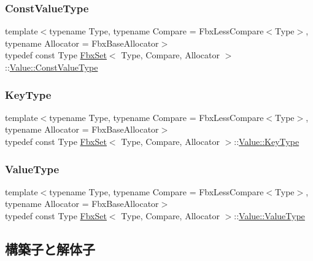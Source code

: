 \subsubsection{\texorpdfstring{Const\+Value\+Type}{ConstValueType}}
{\footnotesize\ttfamily template$<$typename Type, typename Compare = Fbx\+Less\+Compare$<$\+Type$>$, typename Allocator = Fbx\+Base\+Allocator$>$ \\
typedef const Type \hyperlink{class_fbx_set}{Fbx\+Set}$<$ Type, Compare, Allocator $>$\+::\hyperlink{class_fbx_set_1_1_value_a4b01735d9b84587bb21bd4a9d75e419b}{Value\+::\+Const\+Value\+Type}}

\mbox{\label{class_fbx_set_1_1_value_ad4958bd8730776f19c1309f457158acf}} 
\subsubsection{\texorpdfstring{Key\+Type}{KeyType}}
{\footnotesize\ttfamily template$<$typename Type, typename Compare = Fbx\+Less\+Compare$<$\+Type$>$, typename Allocator = Fbx\+Base\+Allocator$>$ \\
typedef const Type \hyperlink{class_fbx_set}{Fbx\+Set}$<$ Type, Compare, Allocator $>$\+::\hyperlink{class_fbx_set_1_1_value_ad4958bd8730776f19c1309f457158acf}{Value\+::\+Key\+Type}}

\mbox{\label{class_fbx_set_1_1_value_aa4757d6676c438c18ab271c57997d8eb}} 
\subsubsection{\texorpdfstring{Value\+Type}{ValueType}}
{\footnotesize\ttfamily template$<$typename Type, typename Compare = Fbx\+Less\+Compare$<$\+Type$>$, typename Allocator = Fbx\+Base\+Allocator$>$ \\
typedef const Type \hyperlink{class_fbx_set}{Fbx\+Set}$<$ Type, Compare, Allocator $>$\+::\hyperlink{class_fbx_set_1_1_value_aa4757d6676c438c18ab271c57997d8eb}{Value\+::\+Value\+Type}}



\subsection{構築子と解体子}
\mbox{\label{class_fbx_set_1_1_value_a3503d6fb6173a58a0b8b93c8413710c1}} 

